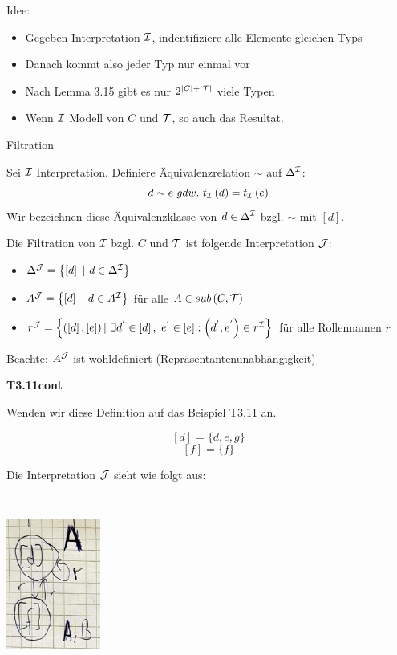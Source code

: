 Idee:

\begin{itemize}
  \item Gegeben Interpretation $\mathcal{I}$, indentifiziere alle Elemente gleichen Typs
  \item Danach kommt also jeder Typ nur einmal vor
  \item Nach Lemma 3.15 gibt es nur $2^{|C|+|\mathcal{T}|}$ viele Typen
  \item Wenn $\mathcal{I}$ Modell von $C$ und $\mathcal{T}$, so auch das Resultat.
\end{itemize}

\begin{definition}{Filtration}

Sei $\mathcal{I}$ Interpretation. Definiere Äquivalenzrelation $\sim$ auf
$\Delta^{\mathcal{I}}$: $$d \sim e\ gdw.\ t_{\mathcal{I}}\left( d \right) = t_{\mathcal{I}}\left( e \right)$$
Wir bezeichnen diese Äquivalenzklasse von $d \in \Delta^{\mathcal{I}}$ bzgl. $\sim$ mit $\left\lbrack d \right\rbrack$.

Die Filtration von $\mathcal{I}$ bzgl. $C$ und $\mathcal{T}$ ist folgende Interpretation $\mathcal{J}$:

\begin{itemize}
\item
  $\Delta^{\mathcal{J}} = \left\{ \left\lbrack d \right\rbrack\ |\ d \in \Delta^{\mathcal{I}} \right\}$
\item
  $A^{\mathcal{J}} = \left\{ \left\lbrack d \right\rbrack\ |\ d \in A^{\mathcal{I}} \right\}$
  für alle $A \in sub\left( C,\mathcal{T} \right)$
\item
  $r^{\mathcal{J}} = \left\{ \left( \left\lbrack d \right\rbrack,\left\lbrack e \right\rbrack \right)|\ \exists d^{'} \in \left\lbrack d \right\rbrack,\ e^{'} \in \left\lbrack e \right\rbrack:\left( d^{'},e^{'} \right) \in r^{\mathcal{I}} \right\}$
  für alle Rollennamen $r$
\end{itemize}

Beachte: $A^{\mathcal{J}}$ ist wohldefiniert (Repräsentantenunabhängigkeit)
\end{definition}

\textbf{T3.11cont}

Wenden wir diese Definition auf das Beispiel T3.11 an.

$$[d]=\{d,e,g\}$$
$$[f]=\{f\}$$

Die Interpretation $\mathcal{J}$ sieht wie folgt aus:

\includegraphics[width=1.21910in,height=2.33200in]{media/314typcont.png}

